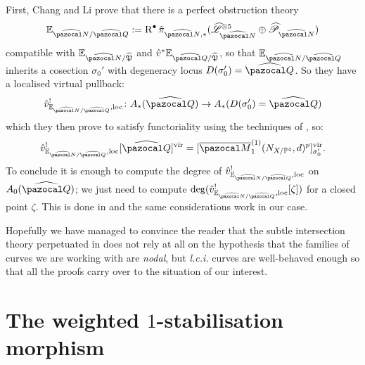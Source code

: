\documentclass[11pt]{amsart}
\newcommand{\Mone}[3]{\overline{\pazocal M}^{(1)}_{#1}(#2,#3)}
\newcommand{\PP}{\mathbb P}
\renewcommand{\to}{\rightarrow}
\newcommand{\hL}{\widehat{\mathcal L}}
\newcommand{\hP}{\widehat{\mathfrak P}}
\newcommand{\R}{\operatorname{R}}
\theoremstyle{plain}
\theoremstyle{definition}
\begin{document}
First, Chang and Li prove that there is a perfect obstruction theory 
\[\mathbb E_{\widehat{\pazocal N}/\widehat{\pazocal Q}}:=\R^{\bullet}\hat\pi_{\widehat{\pazocal N},*}(\hL^{\otimes 5}_{\widehat{\pazocal N}}\oplus \widehat{\mathcal P}_{\widehat{\pazocal N}})\]
 compatible with $\mathbb E_{\widehat{\pazocal N}/\hP}$ and $\hat v^*\mathbb E_{\widehat{\pazocal Q}/\hP}$, so that $\mathbb E_{\widehat{\pazocal N}/\widehat{\pazocal Q}}$ inherits a cosection $\sigma_0'$ with degeneracy locus $D(\sigma_0')=\widehat{\pazocal Q}$. 
So they have a localised virtual pullback:
\[
 \hat v^!_{\mathbb E_{\widehat{\pazocal N}/\widehat{\pazocal Q}},\rm{loc}}\colon A_*(\widehat{\pazocal Q})\to A_*(D(\sigma_0')=\widehat{\pazocal Q})
\]
which they then prove to satisfy functoriality using the techniques of \cite{KKP}, so:
\[\hat v^!_{\mathbb E_{\widehat{\pazocal N}/\widehat{\pazocal Q}},\rm{loc}}[\widehat{\pazocal Q}]^{\rm{vir}}=[\Mone{1}{N_{X/\PP^4}}{d}^p]^{\rm{vir}}_{\rm{\sigma'_0}}.\]
To conclude it is  enough to compute the degree of $\hat v^!_{\mathbb E_{\widehat{\pazocal N}/\widehat{\pazocal Q}},\rm{loc}}$
on $A_0(\widehat{\pazocal Q})$; we just need to compute $\deg(\hat v^!_{\mathbb E_{\widehat{\pazocal N}/\widehat{\pazocal Q}},\rm{loc}}[\zeta])$ for a closed point $\zeta$. This is done in \cite[Theorem 5.7]{CLpfields} and the same considerations work in our case.

Hopefully we have managed to convince the reader that the subtle intersection theory perpetuated in \cite{CLpfields} does not rely at all on the hypothesis that the families of curves we are working with are \emph{nodal}, but \emph{l.c.i.} curves are well-behaved enough so that all the proofs carry over to the situation of our interest.







\section{The weighted $1$-stabilisation morphism}\label{sec:comparison}
\end{document}
